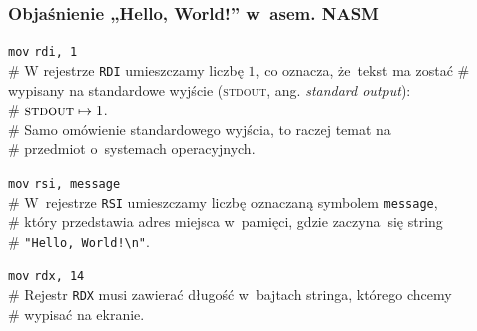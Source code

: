 \documentclass[10pt,t]{beamer}
\begin{document}
\begin{frame}
  \frametitle{Objaśnienie „Hello, World!” w~asem. NASM
    \parencite{Toal-NASM-Tutorial-Ver-2024}}


  \hphantom{aaaaaaaaa} \texttt{mov} \hphantom{aaaaaa} \texttt{rdi, 1} \\
  \# W rejestrze \texttt{RDI} umieszczamy liczbę $1$, co oznacza, że~tekst
  ma zostać
  \# wypisany na standardowe wyjście (\textsc{stdout}, ang.
  \textit{standard output}): \\
  \# $\text{\textsc{stdout}} \mapsto 1$. \\
  \# Samo omówienie standardowego wyjścia, to raczej temat na \\
  \# przedmiot o~systemach operacyjnych.

  \hphantom{aaaaaaaaa} \texttt{mov} \hphantom{aaaaaa}
  \texttt{rsi, message} \\
  \# W~rejestrze \texttt{RSI} umieszczamy liczbę oznaczaną
  symbolem \texttt{message}, \\
  \# który przedstawia adres miejsca w~pamięci, gdzie zaczyna~się string \\
  \# \texttt{"Hello, World!\textbackslash n"}.

  \hphantom{aaaaaaaaa} \texttt{mov} \hphantom{aaaaaa} \texttt{rdx, 14} \\
  \# Rejestr \texttt{RDX} musi zawierać długość w~bajtach stringa, którego
  chcemy \\
  \# wypisać na ekranie.

\end{frame}
\end{document}
